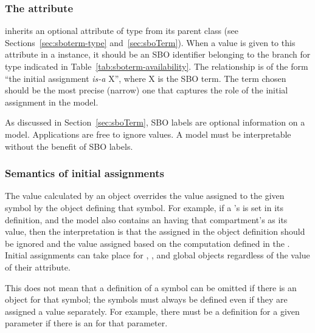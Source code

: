 \subsubsection{The  attribute}
\label{sec:initialassignment-sboterm}

\InitialAssignment inherits an optional 
attribute of type  from its parent
class \SBase (see Sections~\ref{sec:sboterm-type}
and~\ref{sec:sboTerm}).  When a value is given to this
attribute in a \InitialAssignment instance, it should be an
SBO identifier belonging to the branch for type \InitialAssignment  
indicated in Table~\ref{tab:sboterm-availability}.  The relationship is
of the form ``the initial assignment \emph{is-a} X'', where X is
the SBO term.  The term chosen should be the most precise (narrow)
one that captures the role of the initial assignment in the model.

As discussed in Section~\ref{sec:sboTerm}, SBO labels are optional
information on a model.  Applications are free to ignore
 values.  A model must be interpretable without the
benefit of SBO labels.


\subsubsection{Semantics of initial assignments}
\label{sec:initial-assignment-semantics}

The value calculated by an \InitialAssignment object overrides the
value assigned to the given symbol by the object defining that
symbol.  For example, if a \Compartment's  is set in
its definition, and the model also contains an \InitialAssignment
having that compartment's  as its  value,
then the interpretation is that the  assigned in the
\Compartment object definition should be ignored and the value
assigned based on the computation defined in the
\InitialAssignment.  Initial assignments can take place for
\Compartment, \Species, \SpeciesReference and global \Parameter
objects regardless of the value of their 
attribute.

This does not mean that a definition of a symbol can be omitted if
there is an \InitialAssignment object for that symbol; the symbols
must always be defined even if they are assigned a value
separately.  For example, there must be a \Parameter definition
for a given parameter if there is an \InitialAssignment for that
parameter.

